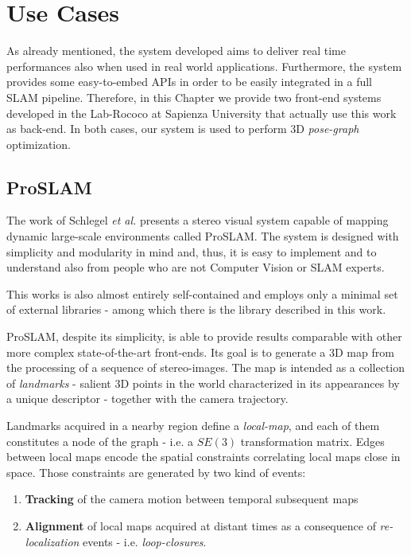 \chapter{Use Cases}\label{ch:cases}
As already mentioned, the system developed aims to deliver real time performances also when used in real world applications. Furthermore, the system provides some easy-to-embed APIs in order to be easily integrated in a full SLAM pipeline. Therefore, in this Chapter we provide two front-end systems developed in the Lab-Rococo at Sapienza University that actually use this work as back-end. In both cases, our system is used to perform 3D \textit{pose-graph} optimization.

\section{ProSLAM}\label{sec:proslam}
The work of Schlegel \textit{et al.} \cite{schlegel2017proslam} presents a stereo visual system capable of mapping dynamic large-scale environments called ProSLAM. The system is designed with simplicity and modularity in mind and, thus, it is easy to implement and to understand also from people who are not Computer Vision or SLAM experts.

This works is also almost entirely self-contained and employs only a minimal set of external libraries - among which there is the library described in this work.

ProSLAM, despite its simplicity, is able to provide results comparable with other more complex state-of-the-art front-ends. Its goal is to generate a 3D map from the processing of a sequence of stereo-images. The map is intended as a collection of \textit{landmarks} - salient 3D points in the world characterized in its appearances by a unique descriptor - together with the camera trajectory. 

Landmarks acquired in a nearby region define a \textit{local-map}, and each of them constitutes a node of the graph - i.e. a $SE(3)$ transformation matrix. Edges between local maps encode the spatial constraints correlating local maps close in space. Those constraints are generated by two kind of events:

\begin{enumerate}
    \item \textbf{Tracking} of the camera motion between temporal subsequent maps
    \item \textbf{Alignment} of local maps acquired at distant times as a consequence of \textit{re-localization} events - i.e. \textit{loop-closures}.
\end{enumerate}

